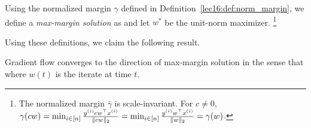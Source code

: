\begin{definition}
Using the normalized margin $\gamma$ defined in Definition~\ref{lec16:def:norm_margin}, we define a \textit{max-margin solution} as
and let $w^*$ be the unit-norm maximizer. \footnote{The normalized margin $\bar{\gamma}$ is scale-invariant. For $c \neq 0$, $\gamma(cw) = \min_{i \in [n]} \frac{y^{(i)} cw^\top x^{(i)}}{\|cw\|_2} = \min_{i \in [n]} \frac{y^{(i)} w^\top x^{(i)}}{\|w\|_2} = \gamma(w)$.}
\end{definition}

Using these definitions, we claim the following result.
\begin{theorem} \label{lec16:thm:maxmargin_gd}
Gradient flow converges to the direction of max-margin solution in the sense that
where $w(t)$ is the iterate at time $t$.
\end{theorem}


